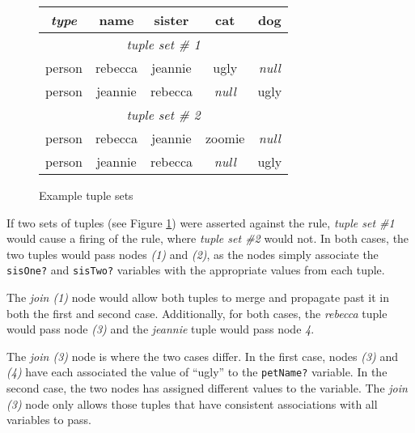 \setlength{\extrarowheight}{3pt}


\begin{figure}[htbpc]
  \begin{center}
    \begin{tabular}{|c||c|c|c|c|}
      \hline
        \emph{\textsf{type}} %
            & \textsf{name} %
            & \textsf{sister} %
            & \textsf{cat} %
            & \textsf{dog} \\
      \hline
      \hline
        \multicolumn{5}{|c|}{\emph{tuple set \# 1}}\\
      \hline 
      \hline 
        person & rebecca & jeannie & ugly & \emph{null} \\
      \hline
        person & jeannie & rebecca & \emph{null} & ugly \\
      \hline
      \hline
        \multicolumn{5}{|c|}{\emph{tuple set \# 2}}\\
      \hline
      \hline
        person & rebecca & jeannie & zoomie & \emph{null} \\
      \hline
        person & jeannie & rebecca & \emph{null} & ugly \\
      \hline
    \end{tabular}
  \end{center}

  \caption{Example tuple sets}
  \label{table.tuplesets}
\end{figure}

If two sets of tuples (see Figure \ref{table.tuplesets}) were
asserted against the rule, \emph{tuple set \#1} would cause a firing
of the rule, where \emph{tuple set \#2} would not.  In both cases,
the two tuples would pass nodes \emph{(1)} and \emph{(2)}, as the
nodes simply associate the \verb|sisOne?| and \verb|sisTwo?| variables
with the appropriate values from each tuple.

The \emph{join (1)} node would allow both tuples to merge and
propagate past it in both the first and second case.  Additionally,
for both cases, the \emph{rebecca} tuple would pass node \emph{(3)}
and the \emph{jeannie} tuple would pass node \emph{4}.

The \emph{join (3)} node is where the two cases differ.  In the first
case, nodes \emph{(3)} and \emph{(4)} have each associated the value
of ``ugly'' to the \verb|petName?| variable.  In the second case, the
two nodes has assigned different values to the variable.  The
\emph{join (3)} node only allows those tuples that have consistent
associations with all variables to pass.
